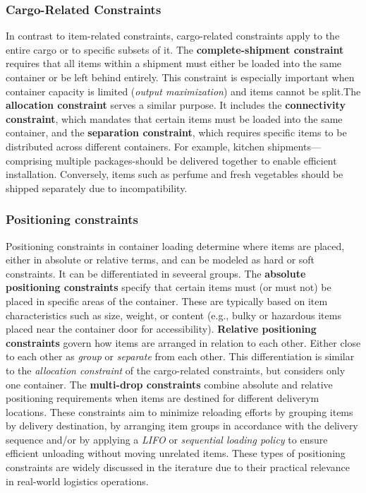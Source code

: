 

\subsubsection{Cargo-Related Constraints}
In contrast to item-related constraints, cargo-related constraints apply to
the entire cargo or to specific subsets of it. The \textbf{complete-shipment constraint}
requires that all items within a shipment must either be loaded into the same
container or be left behind entirely. This constraint is especially important
when container capacity is limited (\textit{output maximization}) and items
cannot be split.The \textbf{allocation constraint} serves a similar purpose.
It includes the \textbf{connectivity constraint}, which mandates that
certain items must be loaded into the same container, and the
\textbf{separation constraint}, which requires specific items to
be distributed across different containers. For example, kitchen
shipments—comprising multiple packages-should be delivered together
to enable efficient installation. Conversely, items such as perfume and fresh
vegetables should be shipped separately due to incompatibility.

\subsubsection{Positioning constraints}

Positioning constraints in container loading determine where items are placed,
either in absolute or relative terms, and can be modeled as hard or soft
constraints. It can be differentiated in seveeral groups. The
\textbf{absolute positioning constraints} specify that certain items
must (or must not) be placed in specific areas of the container. These are
typically based on item characteristics such as size, weight, or
content (e.g., bulky or hazardous items placed near the container door for accessibility).
\textbf{Relative positioning constraints} govern how items are arranged in
relation to each other. Either close to each other as \textit{group} or
\textit{separate} from each other. This differentiation is similar to the
\textit{allocation constraint} of the cargo-related constraints, but considers
only one container. The \textbf{multi-drop constraints} combine
absolute and relative positioning requirements when items are destined for
different deliverym locations. These constraints aim to minimize reloading
efforts by grouping items by delivery destination, by arranging item groups
in accordance with the delivery sequence and/or by applying a
\textit{\gls{LIFO}} or \textit{sequential loading policy}
to ensure efficient unloading without moving unrelated items. These
types of positioning constraints are widely discussed in the iterature due
to their practical relevance in real-world logistics operations.

